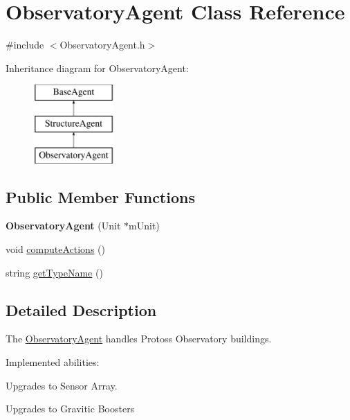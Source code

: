 \hypertarget{class_observatory_agent}{
\section{ObservatoryAgent Class Reference}
\label{class_observatory_agent}
}


{\ttfamily \#include $<$ObservatoryAgent.h$>$}

Inheritance diagram for ObservatoryAgent:\begin{figure}[H]
\begin{center}
\leavevmode
\includegraphics[height=3.000000cm]{class_observatory_agent}
\end{center}
\end{figure}
\subsection*{Public Member Functions}
\begin{DoxyCompactItemize}
\item 
\hypertarget{class_observatory_agent_ace7d4a2e59c196e741a69a1cd5b27a79}{
{\bfseries ObservatoryAgent} (Unit $\ast$mUnit)}
\label{class_observatory_agent_ace7d4a2e59c196e741a69a1cd5b27a79}

\item 
void \hyperlink{class_observatory_agent_ad89bec205c68a74015c6e97644ea4fb7}{computeActions} ()
\item 
string \hyperlink{class_observatory_agent_ab2b6f7a3c6aaf5dd56cd2ed05ed5c626}{getTypeName} ()
\end{DoxyCompactItemize}


\subsection{Detailed Description}
The \hyperlink{class_observatory_agent}{ObservatoryAgent} handles Protoss Observatory buildings.

Implemented abilities:
\begin{DoxyItemize}
\item Upgrades to Sensor Array.
\item Upgrades to Gravitic Boosters
\end{DoxyItemize}

